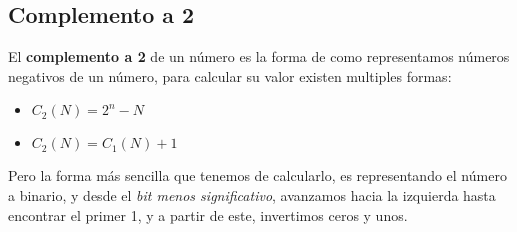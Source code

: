 \subsection{Complemento a 2}

El \textbf{complemento a 2} de un número es la forma de como representamos
números negativos de un número, para calcular su valor existen multiples formas:

\begin{itemize}
    \item $C_2(N) = 2^n - N$
    \item $C_2(N) = C_1(N) + 1$
\end{itemize}

Pero la forma más sencilla que tenemos de calcularlo, es representando el número
a binario, y desde el \emph{bit menos significativo}, avanzamos hacia la izquierda
hasta encontrar el primer 1, y a partir de este, invertimos ceros y unos.